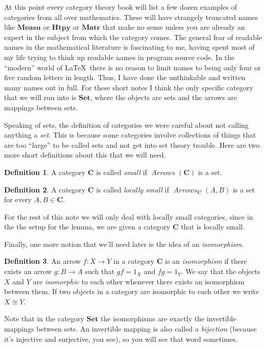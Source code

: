 \documentclass[12pt]{article}
\theoremstyle{definition}
\theoremstyle{definition}
\newtheorem{defn}{Definition}[]
\theoremstyle{definition}
\numberwithin{equation}{section}
\newcommand{\cat}[1]{\mathbf{#1}}      %
\newcommand{\CC}{\cat{C}}
\DeclareMathOperator{\Arrows}{\mathit{Arrows}}
\newcommand{\iso}{\cong}                %
\def\ni{\goodbreak\noindent}
\begin{document}
\goodbreak
At this point every category theory book will list a few dozen examples of categories from
all over mathematics. 
These will have strangely truncated names like
$\cat{Measu}$ or $\cat{Htpy}$ or $\cat{Matr}$ that make no sense unless you are
already an expert in the subject from which the category comes.
{The general fear of readable names in the mathematical literature is fascinating
to me, having spent most of my life trying to think up readable names in program source
code. In the ``modern'' world of \LaTeX\ there is no reason to limit names to being only four
or five random letters in length. Thus, I have done the unthinkable and written many names
out in full.}
For these short notes I think the only specific
category that we will run into is $\cat{Set}$, where the objects are sets and the arrows
are mappings between sets.

Speaking of sets, the definition of categories we were careful about not calling anything
a {\it set}. This is because some categories involve collections of things that are too
``large'' to be called sets and not get into set theory trouble. Here are two more short
definitions about this that we will need.

\begin{defn}
A category $\CC$ is called {\it small} if $\Arrows(\CC)$ is a set.
\end{defn}

\begin{defn}
A category $\CC$ is called {\it locally small} if $\Arrows_{\CC}(A,B)$ is a set for every
$A, B \in \CC$. \end{defn}%
\ni
For the rest of this note we will only deal with locally small categories, since in the
the setup for the lemma, we are given a category $\CC$ that is locally small.

Finally, one more notion that we'll need later is the idea of an {\it isomorphism}.

\begin{defn}
An arrow $f: X \to Y$ in a category $\CC$ is an {\it isomorphism} if there exists an arrow
$g: B \to A$ such that $gf = 1_X$ and $fg = 1_Y$. We say that the objects $X$ and $Y$ are
{\it isomorphic} to each other whenever there exists an isomorphism between them. If two
objects in a category are isomorphic to each other we write $X \iso Y$.
\end{defn}
\ni
Note that in the category $\cat{Set}$ the isomorphisms are exactly the invertible mappings
between sets. An invertible mapping is also called a {\it bijection} (because it's injective
and surjective, you see), so you will see that word sometimes.
\end{document}
